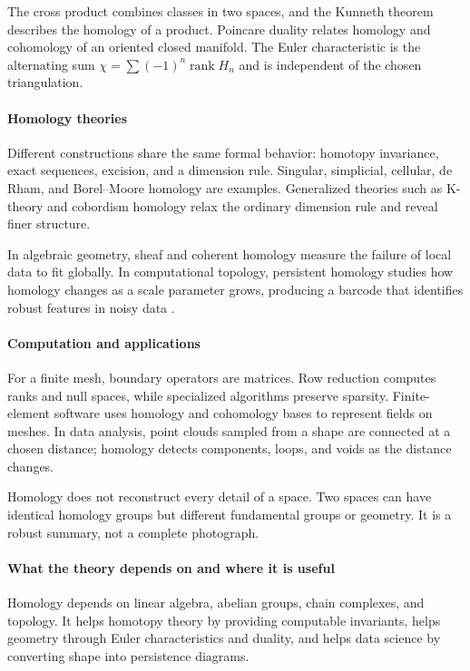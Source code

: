 The cross product combines classes in two spaces, and the Kunneth theorem describes the homology of a product. Poincare duality relates homology and cohomology of an oriented closed manifold. The Euler characteristic is the alternating sum $\chi=\sum(-1)^n\operatorname{rank}H_n$ and is independent of the chosen triangulation.

\paragraph{Homology theories}
Different constructions share the same formal behavior: homotopy invariance, exact sequences, excision, and a dimension rule. Singular, simplicial, cellular, de Rham, and Borel--Moore homology are examples. Generalized theories such as K-theory and cobordism homology relax the ordinary dimension rule and reveal finer structure.

In algebraic geometry, sheaf and coherent homology measure the failure of local data to fit globally. In computational topology, persistent homology studies how homology changes as a scale parameter grows, producing a barcode that identifies robust features in noisy data \cite{homology_theory_ref3}.

\paragraph{Computation and applications}
For a finite mesh, boundary operators are matrices. Row reduction computes ranks and null spaces, while specialized algorithms preserve sparsity. Finite-element software uses homology and cohomology bases to represent fields on meshes. In data analysis, point clouds sampled from a shape are connected at a chosen distance; homology detects components, loops, and voids as the distance changes.

Homology does not reconstruct every detail of a space. Two spaces can have identical homology groups but different fundamental groups or geometry. It is a robust summary, not a complete photograph.

\paragraph{What the theory depends on and where it is useful}
Homology depends on linear algebra, abelian groups, chain complexes, and topology. It helps homotopy theory by providing computable invariants, helps geometry through Euler characteristics and duality, and helps data science by converting shape into persistence diagrams.

